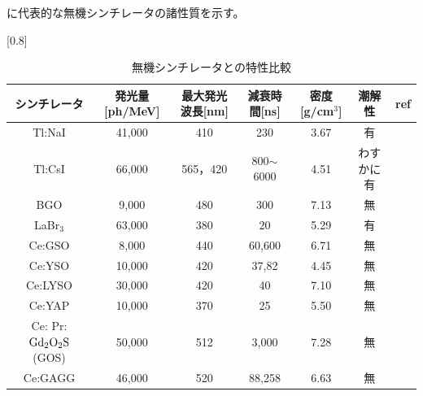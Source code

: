 に代表的な無機シンチレータの諸性質を示す。
\begin{table}[H]
\begin{center}
\scalebox{0.8}[0.8]{
\begin{tabular}{ccccccc} \hline
シンチレータ & 発光量[ph/MeV] & 最大発光波長[nm] & 減衰時間[ns] & 密度[g/cm$^3$] & 潮解性 & ref \\\hline
Tl:NaI & 41,000 & 410 & 230 & 3.67 & 有 & \cite{sinci} \\
Tl:CsI & 66,000 & 565，420 & 800$\sim$6000 & 4.51 & わすかに有 & \cite{sinci} \\
BGO & 9,000 & 480 & 300 & 7.13 & 無 & \cite{sinci} \\
LaBr$_3$ & 63,000 & 380 & 20 & 5.29 & 有 & \cite{sinci} \\
Ce:GSO & 8,000 & 440 & 60,600 & 6.71 & 無 & \cite{sinci} \\
Ce:YSO & 10,000 & 420 & 37,82 & 4.45 & 無 & \cite{sinci} \\
Ce:LYSO & 30,000 & 420 & 40 & 7.10 & 無 & \cite{sinci} \\
Ce:YAP & 10,000 & 370 & 25 & 5.50 & 無 & \cite{sinci}\\
Ce: Pr:$\rm Gd_2O_2S$(GOS) & 50,000 & 512  & 3,000 & 7.28 &  無 & \cite{hitachi} \\
Ce:GAGG & 46,000 & 520 & 88,258 & 6.63 & 無 & \cite{sinci} \\\hline
\end{tabular}
}
\end{center}
\caption{無機シンチレータとの特性比較}
\label{sinti}
\end{table}



